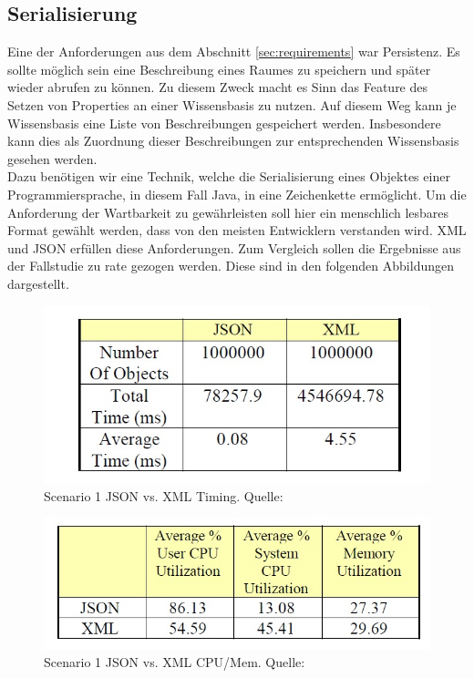 \documentclass[a4paper]{article}
\begin{document}
	\subsection{Serialisierung}
	\label{sec:konz_serialisierung}
	
	Eine der Anforderungen aus dem Abschnitt \ref{sec:requirements} war Persistenz.
	Es sollte möglich sein eine Beschreibung eines Raumes zu speichern und später
	wieder abrufen zu können. Zu diesem Zweck macht es Sinn das Feature des Setzen
	von Properties an einer Wissensbasis zu nutzen. Auf diesem Weg kann je 
	Wissensbasis eine Liste von Beschreibungen gespeichert werden. Insbesondere
	kann dies als Zuordnung dieser Beschreibungen zur entsprechenden Wissensbasis
	gesehen werden. \\
	
	Dazu benötigen wir eine Technik, welche die Serialisierung eines Objektes einer
	Programmiersprache, in diesem Fall Java, in eine Zeichenkette ermöglicht. Um
	die Anforderung der Wartbarkeit zu gewährleisten soll hier ein menschlich
	lesbares Format gewählt werden, dass von den meisten Entwicklern verstanden
	wird. XML und JSON erfüllen diese Anforderungen. Zum Vergleich sollen die
	Ergebnisse aus der Fallstudie \cite{XmlJson} zu rate gezogen werden.
	Diese sind in den folgenden Abbildungen dargestellt.
	
	\begin{figure}[H] 
		\centerline{
			\includegraphics[scale=0.78]{../Bilder/xml_json_time_sen1.jpg}
		}
		\caption{Scenario 1 JSON vs. XML Timing. Quelle: \cite{XmlJson}}
		\label{fig:xml_json_time_sen1}
	\end{figure}
	
	\begin{figure}[H] 
		\centerline{
			\includegraphics[scale=0.78]{../Bilder/xml_json_mem_sen1.jpg}
		}
		\caption{Scenario 1 JSON vs. XML CPU/Mem. Quelle: \cite{XmlJson}}
		\label{fig:xml_json_mem_sen1}
	\end{figure}
	
\end{document}
